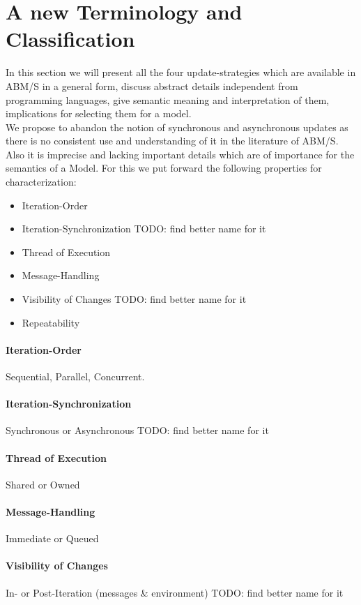 \section{A new Terminology and Classification}
In this section we will present all the four update-strategies which are available in ABM/S in a general form, discuss abstract details independent from programming languages, give semantic meaning and interpretation of them, implications for selecting them for a model. \\
We propose to abandon the notion of synchronous and asynchronous updates as there is no consistent use and understanding of it in the literature of ABM/S. Also it is imprecise and lacking important details which are of importance for the semantics of a Model. For this we put forward the following properties for characterization: 

\begin{itemize}
	\item Iteration-Order
	\item Iteration-Synchronization 	TODO: find better name for it
	\item Thread of Execution
 	\item Message-Handling	
 	\item Visibility of Changes 		TODO: find better name for it
	\item Repeatability
\end{itemize}

\paragraph{Iteration-Order}
Sequential, Parallel, Concurrent.

\paragraph{Iteration-Synchronization}
Synchronous or Asynchronous
TODO: find better name for it

\paragraph{Thread of Execution}
Shared or Owned

\paragraph{Message-Handling}
Immediate or Queued

\paragraph{Visibility of Changes}
In- or Post-Iteration
(messages \& environment)
TODO: find better name for it

